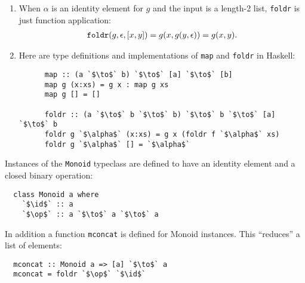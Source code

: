 \begin{remark*}\hspace{0pt}
  \begin{enumerate}
  \item When $\alpha$ is an identity element for $g$ and the input is a length-2 list, {\tt foldr}
    is just function application:
  \begin{align*}
    \text{{\tt foldr}}(g, \epsilon, [x, y]) = g(x, g(y, \epsilon)) = g(x, y).
  \end{align*}
\item   Here are type definitions and implementations of {\tt map} and {\tt foldr} in Haskell:
  \begin{normalfont}
    \begin{verbatim}
      map :: (a `$\to$` b) `$\to$` [a] `$\to$` [b]
      map g (x:xs) = g x : map g xs
      map g [] = []

      foldr :: (a `$\to$` b `$\to$` b) `$\to$` b `$\to$` [a] `$\to$` b
      foldr g `$\alpha$` (x:xs) = g x (foldr f `$\alpha$` xs)
      foldr g `$\alpha$` [] = `$\alpha$`
    \end{verbatim}
  \end{normalfont}
  \end{enumerate}
\end{remark*}

\newpage
Instances of the {\tt Monoid} typeclass are defined to have an identity element and a closed binary
operation:
\begin{verbatim}
  class Monoid a where
    `$\id$` :: a
    `$\op$` :: a `$\to$` a `$\to$` a
\end{verbatim}

In addition a function {\tt mconcat} is defined for Monoid instances. This ``reduces'' a list of elements:
\begin{verbatim}
  mconcat :: Monoid a => [a] `$\to$` a
  mconcat = foldr `$\op$` `$\id$`
\end{verbatim}

